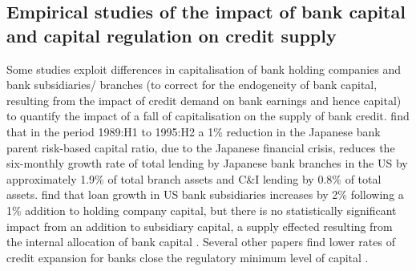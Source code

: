 \documentclass[
  12,
]{article}
\begin{document}
\hypertarget{empirical-studies-of-the-impact-of-bank-capital-and-capital-regulation-on-credit-supply}{%
\subsection{Empirical studies of the impact of bank capital and capital regulation on credit supply}\label{empirical-studies-of-the-impact-of-bank-capital-and-capital-regulation-on-credit-supply}}

Some studies exploit differences in capitalisation of bank holding companies and bank subsidiaries/ branches (to correct for the endogeneity of bank capital, resulting from the impact of credit demand on bank earnings and hence capital) to quantify the impact of a fall of capitalisation on the supply of bank credit. \citet{peek1997international} find that in the period 1989:H1 to 1995:H2 a 1\% reduction in the Japanese bank parent risk-based capital ratio, due to the Japanese financial crisis, reduces the six-monthly growth rate of total lending by Japanese bank branches in the US by approximately 1.9\% of total branch assets and C\&I lending by 0.8\% of total assets. \citet{houston1997capital} find that loan growth in US bank subsidiaries increases by 2\% following a 1\% addition to holding company capital, but there is no statistically significant impact from an addition to subsidiary capital, a supply effected resulting from the internal allocation of bank capital \citep[see,][ on losses in the 1930s]{calomiris2003fundamentals, calomiris1998bank}. Several other papers find lower rates of credit expansion for banks close the regulatory minimum level of capital \citep[see,][]{hancock1994bank, berger1994lines, nier2005bank, van2008welfare, gambacorta2004does, berrospide2010effects}.
\end{document}
